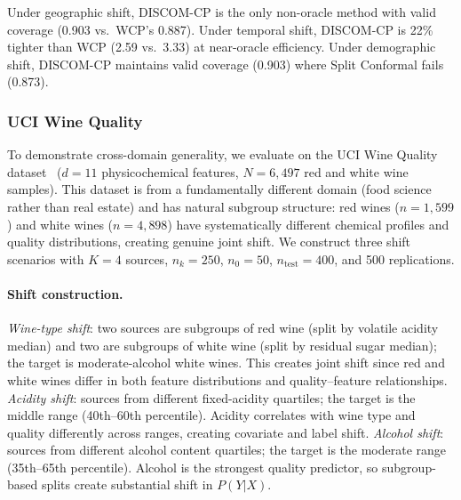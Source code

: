 \documentclass{article}
\newcommand{\DISCOM}{\textsc{DISCOM-CP}}
\begin{document}
Under geographic shift, \DISCOM{} is the only non-oracle method with valid coverage (0.903 vs.\ WCP's 0.887). Under temporal shift, \DISCOM{} is 22\% tighter than WCP (2.59 vs.\ 3.33) at near-oracle efficiency. Under demographic shift, \DISCOM{} maintains valid coverage (0.903) where Split Conformal fails (0.873).

\subsubsection{UCI Wine Quality}
\label{sec:real_wine}

To demonstrate cross-domain generality, we evaluate on the UCI Wine Quality dataset~\citep{cortez2009wine} ($d = 11$ physicochemical features, $N = 6{,}497$ red and white wine samples). This dataset is from a fundamentally different domain (food science rather than real estate) and has natural subgroup structure: red wines ($n = 1{,}599$) and white wines ($n = 4{,}898$) have systematically different chemical profiles and quality distributions, creating genuine joint shift. We construct three shift scenarios with $K = 4$ sources, $n_k = 250$, $n_0 = 50$, $n_{\text{test}} = 400$, and 500 replications.

\paragraph{Shift construction.} \emph{Wine-type shift}: two sources are subgroups of red wine (split by volatile acidity median) and two are subgroups of white wine (split by residual sugar median); the target is moderate-alcohol white wines. This creates joint shift since red and white wines differ in both feature distributions and quality--feature relationships. \emph{Acidity shift}: sources from different fixed-acidity quartiles; the target is the middle range (40th--60th percentile). Acidity correlates with wine type and quality differently across ranges, creating covariate and label shift. \emph{Alcohol shift}: sources from different alcohol content quartiles; the target is the moderate range (35th--65th percentile). Alcohol is the strongest quality predictor, so subgroup-based splits create substantial shift in $P(Y|X)$.
\end{document}
